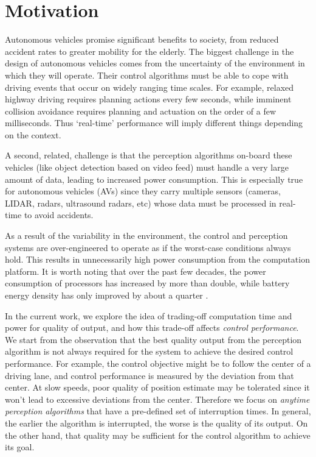 \section{Motivation}
\label{sec:motivation}

Autonomous vehicles promise significant benefits to society, from reduced accident rates to greater mobility for the elderly. 
The biggest challenge in the design of autonomous vehicles comes from the uncertainty of the environment in which they will operate. 
Their control algorithms must be able to cope with driving events that occur on widely ranging time scales. 
For example, relaxed highway driving requires planning actions every few seconds, while imminent collision avoidance requires planning and actuation on the order of a few milliseconds.
Thus `real-time' performance will imply different things depending on the context. 

A second, related, challenge is that the perception algorithms on-board these vehicles (like object detection based on video feed) must handle a very large amount of data, leading to increased power consumption. 
This is especially true for autonomous vehicles (AVs) since they carry multiple sensors (cameras, LIDAR, radars, ultrasound radars, etc) whose data must be processed in real-time to avoid accidents.

As a result of the variability in the environment, the control and perception systems are over-engineered to operate as if the worst-case conditions always hold. 
This results in unnecessarily high power consumption from the computation platform. It is worth noting that over the past few decades, the power consumption of processors has increased by more than double, while battery energy density has only improved by about a quarter \cite{Lahiri}. 

In the current work, we explore the idea of trading-off computation time and power for quality of output, and how this trade-off affects \emph{control performance}.
We start from the observation that the best quality output from the perception algorithm is not always required for the system to achieve the desired control performance.
For example, the control objective might be to follow the center of a driving lane, and control performance is measured by the deviation from that center.
At slow speeds, poor quality of position estimate may be tolerated since it won't lead to excessive deviations from the center.
Therefore we focus on \emph{anytime perception algorithms} that have a pre-defined set of interruption times. 
In general, the earlier the algorithm is interrupted, the worse is the quality of its output. 
On the other hand, that quality may be sufficient for the control algorithm to achieve its goal.

